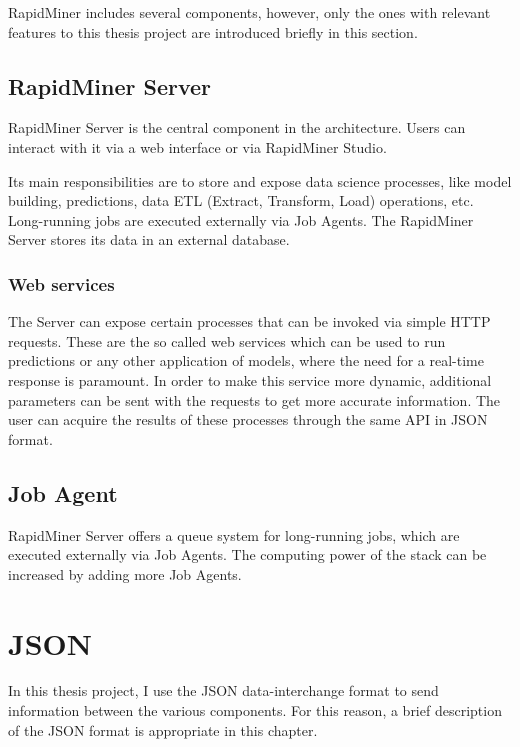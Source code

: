 RapidMiner includes several components, however, only the ones with relevant features to this thesis project are introduced briefly in this section. \cite{rapidminer-server-arch}

\subsection{RapidMiner Server}

RapidMiner Server is the central component in the architecture. Users can interact with it via a web interface or via RapidMiner Studio.

Its main responsibilities are to store and expose data science processes, like model building, predictions, data ETL (Extract, Transform, Load) operations, etc. Long-running jobs are executed externally via Job Agents. The RapidMiner Server stores its data in an external database.

\subsubsection{Web services}
The Server can expose certain processes that can be invoked via simple HTTP requests. These are the so called web services which can be used to run predictions or any other application of models, where the need for a real-time response is paramount. In order to make this service more dynamic, additional parameters can be sent with the requests to get more accurate information. The user can acquire the results of these processes through the same API in JSON format.

\subsection{Job Agent}

RapidMiner Server offers a queue system for long-running jobs, which are executed externally via Job Agents. The computing power of the stack can be increased by adding more Job Agents.

\section{JSON}


In this thesis project, I use the JSON data-interchange format to send information between the various components. For this reason, a brief description of the JSON format is appropriate in this chapter.

